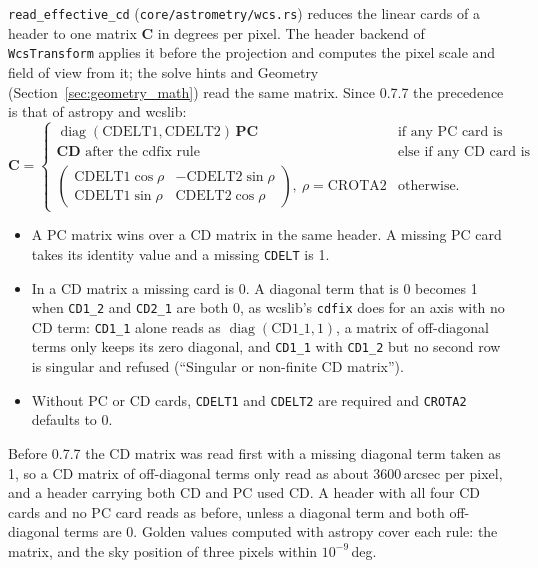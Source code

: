 \documentclass[11pt,a4paper]{article}
\newcommand{\code}[1]{\texttt{\small #1}}
\newcommand{\mat}[1]{\mathbf{#1}}
\begin{document}
    \code{read\_effective\_cd} (\code{core/\allowbreak astrometry/\allowbreak wcs.rs}) reduces the linear cards of a header to one matrix $\mat{C}$ in degrees per pixel. The header backend of \code{WcsTransform} applies it before the projection and computes the pixel scale and field of view from it; the solve hints and Geometry (Section~\ref{sec:geometry_math}) read the same matrix. Since 0.7.7 the precedence is that of astropy and wcslib:
    \begin{equation}
        \mat{C} =
        \begin{cases}
            \operatorname{diag}(\text{CDELT1}, \text{CDELT2})\,\mat{PC} & \text{if any PC card is present,} \\
            \mat{CD} \text{ after the cdfix rule} & \text{else if any CD card is present,} \\
            \begin{pmatrix} \text{CDELT1}\cos\rho & -\text{CDELT2}\sin\rho \\ \text{CDELT1}\sin\rho & \text{CDELT2}\cos\rho \end{pmatrix},\ \rho = \text{CROTA2} & \text{otherwise.}
        \end{cases}
    \end{equation}
    \begin{itemize}[nosep]
    \item A PC matrix wins over a CD matrix in the same header. A missing PC card takes its identity value and a missing \code{CDELT} is 1.
    \item In a CD matrix a missing card is 0. A diagonal term that is 0 becomes 1 when \code{CD1\_2} and \code{CD2\_1} are both 0, as wcslib's \code{cdfix} does for an axis with no CD term: \code{CD1\_1} alone reads as $\operatorname{diag}(\text{CD1\_1}, 1)$, a matrix of off-diagonal terms only keeps its zero diagonal, and \code{CD1\_1} with \code{CD1\_2} but no second row is singular and refused (``Singular or non-finite CD matrix'').
    \item Without PC or CD cards, \code{CDELT1} and \code{CDELT2} are required and \code{CROTA2} defaults to 0.
    \end{itemize}
    Before 0.7.7 the CD matrix was read first with a missing diagonal term taken as 1, so a CD matrix of off-diagonal terms only read as about 3600\,arcsec per pixel, and a header carrying both CD and PC used CD. A header with all four CD cards and no PC card reads as before, unless a diagonal term and both off-diagonal terms are 0. Golden values computed with astropy cover each rule: the matrix, and the sky position of three pixels within $10^{-9}$\,deg.
\end{document}
